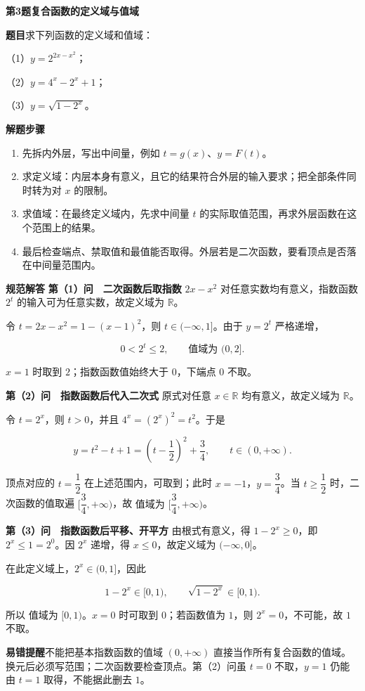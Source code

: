 \documentclass[UTF8,zihao=-4]{ctexart}
\newcommand{\subq}[1]{\par\Needspace{2\baselineskip}（#1）}
\newcommand{\labeltext}[1]{\par\textbf{#1}\quad}
\begin{document}
\clearpage
{\Large\bfseries 第3题\quad 复合函数的定义域与值域}
\labeltext{题目}求下列函数的定义域和值域：
\subq{1}$y=2^{2x-x^2}$；
\subq{2}$y=4^x-2^x+1$；
\subq{3}$y=\sqrt{1-2^x}$。
\labeltext{解题步骤}\begin{enumerate}
\item 先拆内外层，写出中间量，例如 $t=g(x)$、$y=F(t)$。
\item 求定义域：内层本身有意义，且它的结果符合外层的输入要求；把全部条件同时转为对 $x$ 的限制。
\item 求值域：在最终定义域内，先求中间量 $t$ 的实际取值范围，再求外层函数在这个范围上的结果。
\item 最后检查端点、禁取值和最值能否取得。外层若是二次函数，要看顶点是否落在中间量范围内。
\end{enumerate}
\labeltext{规范解答}
\textbf{第（1）问　二次函数后取指数}\quad
$2x-x^2$ 对任意实数均有意义，指数函数 $2^t$ 的输入可为任意实数，故定义域为 $\boxed{\mathbb R}$。\par
令 $t=2x-x^2=1-(x-1)^2$，则 $t\in(-\infty,1]$。由于 $y=2^t$ 严格递增，\par
\[0<2^t\le2,\qquad\boxed{\text{值域为 }(0,2]}.\]\par
$x=1$ 时取到 $2$；指数函数值始终大于 $0$，下端点 $0$ 不取。\par
\par{}
\textbf{第（2）问　指数函数后代入二次式}\quad
原式对任意 $x\in\mathbb R$ 均有意义，故定义域为 $\boxed{\mathbb R}$。\par
令 $t=2^x$，则 $t>0$，并且 $4^x=(2^x)^2=t^2$。于是\par
\[y=t^2-t+1=\left(t-\frac12\right)^2+\frac34,\qquad t\in(0,+\infty).\]\par
顶点对应的 $t=\dfrac12$ 在上述范围内，可取到；此时 $x=-1$，$y=\dfrac34$。当 $t\ge\dfrac12$ 时，二次函数的值取遍 $[\dfrac34,+\infty)$，故 $\boxed{\text{值域为 }[\dfrac34,+\infty)}$。\par
\par{}
\textbf{第（3）问　指数函数后平移、开平方}\quad
由根式有意义，得 $1-2^x\ge0$，即 $2^x\le1=2^0$。因 $2^x$ 递增，得 $x\le0$，故定义域为 $\boxed{(-\infty,0]}$。\par
在此定义域上，$2^x\in(0,1]$，因此\par
\[1-2^x\in[0,1),\qquad\sqrt{1-2^x}\in[0,1).\]\par
所以 $\boxed{\text{值域为 }[0,1)}$。$x=0$ 时可取到 $0$；若函数值为 $1$，则 $2^x=0$，不可能，故 $1$ 不取。\par
\labeltext{易错提醒}不能把基本指数函数的值域 $(0,+\infty)$ 直接当作所有复合函数的值域。换元后必须写范围；二次函数要检查顶点。第（2）问虽 $t=0$ 不取，$y=1$ 仍能由 $t=1$ 取得，不能据此删去 $1$。
\end{document}
